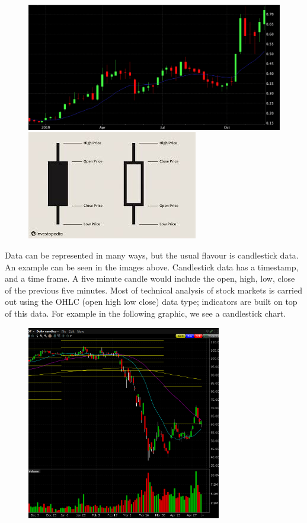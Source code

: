 \documentclass[14pt]{extarticle}
\begin{document}
\begin{figure}[h]
\includegraphics[scale=0.1]{stock_chart}
\includegraphics[scale=0.6]{candlestick}
\centering
\end{figure}

Data can be represented in many ways, but the usual flavour is candlestick data. An example can be seen in the images above. Candlestick data has a timestamp, and a time frame. A five minute candle would include the open, high, low, close of the previous five minutes. Most of technical analysis of stock markets is carried out using the OHLC (open high low close) data type; indicators are built on top of this data. For example in the following graphic, we see a candlestick chart.
\newpage

\begin{figure}
\includegraphics[scale=0.3, height=8.5cm, keepaspectratio]{cropped}
\label{fig:myfig}
\end{figure}
\end{document}
